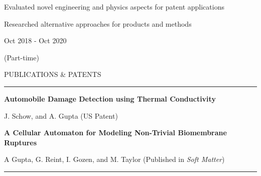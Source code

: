 \documentclass[letterpaper,10pt,oneside]{article}
\begin{document}
\begin{body}
\begin{detail}
\vspace{-2.0ex}
\BulletItem
Evaluated novel engineering and physics aspects for patent applications

\BulletItem
Researched alternative approaches for products and methods
\end{detail}

\begin{subtitle}
\vspace{-7.8ex}
{{Oct 2018 - Oct 2020}} 
\end{subtitle}

\begin{subtitle}
\vspace{-2.0ex}
{{(Part-time)}} 
\end{subtitle}


{
\hspace{-1.72in}\noindent\color{cblue}
{PUBLICATIONS \& PATENTS} %
}

\vspace{-1.6ex}
{\hspace{-1.73in}\noindent\color{dblue}\rule{6.935in}{0.4pt}} %
\vspace{-2ex}

{\hspace{-1.76in}\fontsize{9}{1}
\textbf{Automobile Damage Detection using Thermal Conductivity}}

{\hspace{-1.76in}\fontsize{9}{1}
{\small J. Schow, and A. Gupta (US Patent)}
}

\vspace{1ex}

{\hspace{-1.76in}\fontsize{9}{1}
\textbf{A Cellular Automaton for Modeling Non-Trivial Biomembrane Ruptures}
}

{\hspace{-1.76in}\fontsize{9}{1} 
{\small A Gupta, G. Reint, I. Gozen, and M. Taylor (Published in \textit{Soft Matter})}}

\vspace{-1ex}


{\hspace{-1.73in}\noindent\color{dblue}\rule{6.935in}{0.4pt}} %
\vspace{-3ex}


\end{body}
\end{document}
